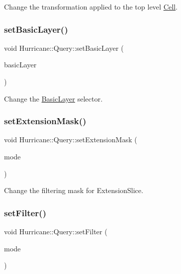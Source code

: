 Change the transformation applied to the top level \mbox{\hyperlink{classHurricane_1_1Cell}{Cell}}. \mbox{\label{classHurricane_1_1Query_ac3718c4e2cd4d5e80af32558285481af}} 
\subsubsection{\texorpdfstring{set\+Basic\+Layer()}{setBasicLayer()}}
{\footnotesize\ttfamily void Hurricane\+::\+Query\+::set\+Basic\+Layer (\begin{DoxyParamCaption}\item[{const \mbox{\hyperlink{classHurricane_1_1BasicLayer}{Basic\+Layer}} $\ast$}]{basic\+Layer }\end{DoxyParamCaption})\hspace{0.3cm}{\ttfamily [virtual]}}

Change the \mbox{\hyperlink{classHurricane_1_1BasicLayer}{Basic\+Layer}} selector. \mbox{\label{classHurricane_1_1Query_af7f83fd3aefe1b5654f9bdd3566fe0d4}} 
\subsubsection{\texorpdfstring{set\+Extension\+Mask()}{setExtensionMask()}}
{\footnotesize\ttfamily void Hurricane\+::\+Query\+::set\+Extension\+Mask (\begin{DoxyParamCaption}\item[{Extension\+Slice\+::\+Mask}]{mode }\end{DoxyParamCaption})\hspace{0.3cm}{\ttfamily [inline]}}

Change the filtering mask for Extension\+Slice. \mbox{\label{classHurricane_1_1Query_a457a0cda5ea5ad849a46aefce2514963}} 
\subsubsection{\texorpdfstring{set\+Filter()}{setFilter()}}
{\footnotesize\ttfamily void Hurricane\+::\+Query\+::set\+Filter (\begin{DoxyParamCaption}\item[{Mask}]{mode }\end{DoxyParamCaption})\hspace{0.3cm}{\ttfamily [inline]}}

